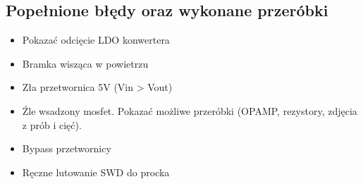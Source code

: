 \subsection{Popełnione błędy oraz wykonane przeróbki}
\label{sub:mistakes}
\begin{itemize}
    \item Pokazać odcięcie LDO konwertera
    \item Bramka wisząca w powietrzu
    \item Zła przetwornica 5V (Vin > Vout)
    \item Źle wsadzony mosfet. Pokazać możliwe przeróbki (OPAMP, rezystory, zdjęcia z prób i cięć).
    \item Bypass przetwornicy
    \item Ręczne lutowanie SWD do procka
\end{itemize}

